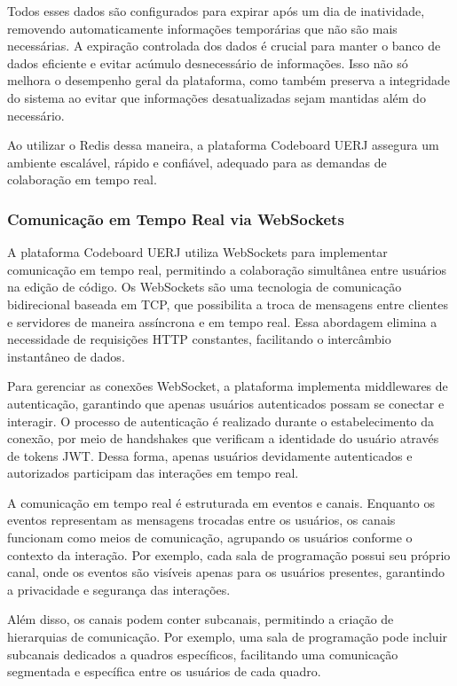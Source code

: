 Todos esses dados são configurados para expirar após um dia de inatividade, removendo automaticamente informações temporárias que não são mais necessárias. A expiração controlada dos dados é crucial para manter o banco de dados eficiente e evitar acúmulo desnecessário de informações. Isso não só melhora o desempenho geral da plataforma, como também preserva a integridade do sistema ao evitar que informações desatualizadas sejam mantidas além do necessário.

Ao utilizar o Redis dessa maneira, a plataforma Codeboard UERJ assegura um ambiente escalável, rápido e confiável, adequado para as demandas de colaboração em tempo real.

\subsubsection{Comunicação em Tempo Real via WebSockets}

A plataforma Codeboard UERJ utiliza WebSockets para implementar comunicação em tempo real, permitindo a colaboração simultânea entre usuários na edição de código. Os WebSockets são uma tecnologia de comunicação bidirecional baseada em TCP, que possibilita a troca de mensagens entre clientes e servidores de maneira assíncrona e em tempo real. Essa abordagem elimina a necessidade de requisições HTTP constantes, facilitando o intercâmbio instantâneo de dados.

Para gerenciar as conexões WebSocket, a plataforma implementa middlewares de autenticação, garantindo que apenas usuários autenticados possam se conectar e interagir. O processo de autenticação é realizado durante o estabelecimento da conexão, por meio de handshakes que verificam a identidade do usuário através de tokens JWT. Dessa forma, apenas usuários devidamente autenticados e autorizados participam das interações em tempo real.

A comunicação em tempo real é estruturada em eventos e canais. Enquanto os eventos representam as mensagens trocadas entre os usuários, os canais funcionam como meios de comunicação, agrupando os usuários conforme o contexto da interação. Por exemplo, cada sala de programação possui seu próprio canal, onde os eventos são visíveis apenas para os usuários presentes, garantindo a privacidade e segurança das interações.

Além disso, os canais podem conter subcanais, permitindo a criação de hierarquias de comunicação. Por exemplo, uma sala de programação pode incluir subcanais dedicados a quadros específicos, facilitando uma comunicação segmentada e específica entre os usuários de cada quadro.

